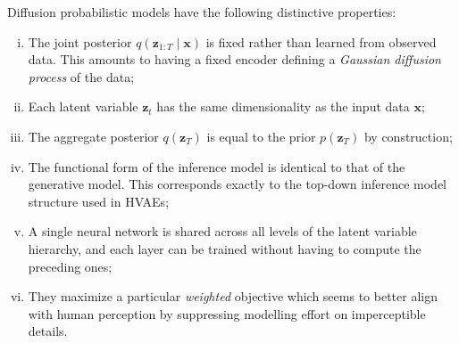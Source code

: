 Diffusion probabilistic models have the following distinctive properties:
\begin{enumerate}[(i)]
    \item The joint posterior $q(\mathbf{z}_{1:T} \mid \mathbf{x})$ is fixed rather than learned from observed data. This amounts to having a fixed encoder defining a \textit{Gaussian diffusion process} of the data;
    \item Each latent variable $\mathbf{z}_t$ has the same dimensionality as the input data $\mathbf{x}$;
    \item The aggregate posterior $q(\mathbf{z}_T)$ is equal to the prior $p(\mathbf{z}_T)$ by construction;
    \item The functional form of the inference model is identical to that of the generative model. This corresponds exactly to the top-down inference model structure used in HVAEs;
    \item A single neural network is shared across all levels of the latent variable hierarchy, and each layer can be trained without having to compute the preceding ones;
    \item They maximize a particular \textit{weighted} objective which seems to better align with human perception by suppressing modelling effort on imperceptible details.
\end{enumerate}
%

